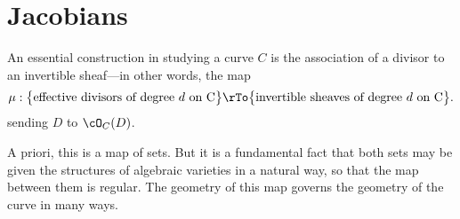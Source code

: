 


\chapter{Jacobians}\label{new Jacobians chapter}

%
%
%
%


An essential construction in studying a curve $C$ is the association of a divisor  to an invertible sheaf---in other words, the map
$$
\mu : \big\{ \text{effective divisors of degree $d$ on C}\big\} \rTo \big\{ \text{invertible sheaves of degree $d$ on C} \big\}.
$$
sending $D$ to $\cO_C(D)$.

A priori, this is a map of sets. But it is a fundamental fact that both sets may  be given the structures of  algebraic varieties in a natural way, so that the map between them is regular. The geometry of this map governs the geometry of the curve in many ways.


